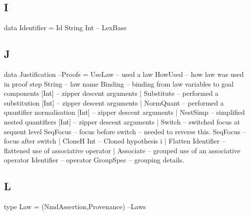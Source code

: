 \subsection{I}

\begin{code}
data Identifier = Id String Int                                    -- LexBase
\end{code}

\newpage
\subsection{J}

\begin{code}
data Justification                                                    --Proofs
  = UseLaw             -- used a law
      HowUsed              -- how law was used in proof step
      String               -- law name
      Binding              -- binding from law variables to goal components
      [Int]                -- zipper descent arguments
  | Substitute         -- performed a substitution
      [Int]                -- zipper descent arguments
  | NormQuant          -- performed a quantifier normalisation
      [Int]                -- zipper descent arguments
  | NestSimp           -- simplified nested quantifiers
      [Int]                -- zipper descent arguments
  | Switch             -- switched focus at sequent level
      SeqFocus             -- focus before switch -- needed to reverse this.
      SeqFocus             -- focus after switch
  | CloneH Int         --  Cloned hypothesis i
  | Flatten Identifier -- flattened use of associative operator
  | Associate          -- grouped use of an associative operator
      Identifier           -- operator
      GroupSpec            -- grouping details.
\end{code}


\subsection{L}

\begin{code}
type Law = (NmdAssertion,Provenance)                                    --Laws
\end{code}

